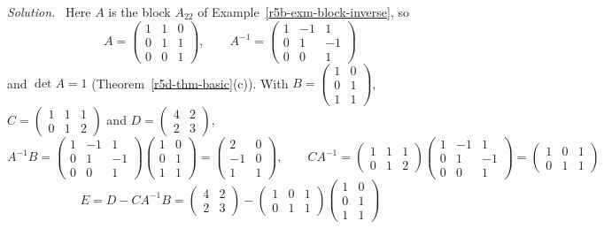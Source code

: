 \documentclass[12pt]{article}
\theoremstyle{definition}
\newenvironment{solution}{\par\noindent\textit{Solution.}\ }{\par\smallskip}
\begin{document}
\begin{solution}
Here \(A\) is the block \(A_{22}\) of Example~\ref{r5b-exm-block-inverse}, so
\[
A=\begin{pmatrix}1&1&0\\0&1&1\\0&0&1\end{pmatrix},\qquad A^{-1}=\begin{pmatrix}1&-1&1\\0&1&-1\\0&0&1\end{pmatrix}
\]
and \(\det A=1\) (Theorem~\ref{r5d-thm-basic}(c)). With
\(B=\left(\begin{smallmatrix}1&0\\0&1\\1&1\end{smallmatrix}\right)\),
\(C=\left(\begin{smallmatrix}1&1&1\\0&1&2\end{smallmatrix}\right)\) and
\(D=\left(\begin{smallmatrix}4&2\\2&3\end{smallmatrix}\right)\),
\[
A^{-1}B=\begin{pmatrix}1&-1&1\\0&1&-1\\0&0&1\end{pmatrix}\begin{pmatrix}1&0\\0&1\\1&1\end{pmatrix}=\begin{pmatrix}2&0\\-1&0\\1&1\end{pmatrix},\qquad
CA^{-1}=\begin{pmatrix}1&1&1\\0&1&2\end{pmatrix}\begin{pmatrix}1&-1&1\\0&1&-1\\0&0&1\end{pmatrix}=\begin{pmatrix}1&0&1\\0&1&1\end{pmatrix}
\]
\[
E=D-CA^{-1}B=\begin{pmatrix}4&2\\2&3\end{pmatrix}-\begin{pmatrix}1&0&1\\0&1&1\end{pmatrix}\begin{pmatrix}1&0\\0&1\\1&1\end{pmatrix}
\]
\end{solution}
\end{document}

